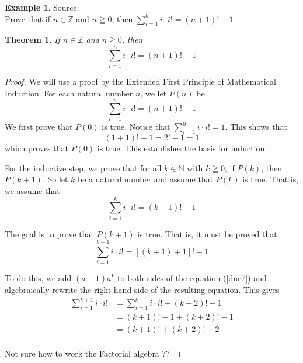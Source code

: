 \documentclass{book}
\newtheorem{theorem}{Theorem}[section]
\theoremstyle{definition}
\newtheorem{example}{Example}[definition]
\theoremstyle{remark}
\newcommand{\bb}[1]{\mathbb{#1}}
\newcommand{\m}{\cdot}
\begin{document}
\newpage
\begin{example}
Source: \cite[C.10]{Hammack} \\ 
Prove that if $n \in \bb{Z}$ and $n \geqq 0$, then $\sum_{i=1}^{k}{i \m i!} = (n+1)! - 1$

\begin{tcolorbox}
    \begin{theorem}
        If $n \in \bb{Z}$ and $n \geqq 0$, then
        \begin{equation*}
             \sum_{i=1}^{n}{i \m i!} = (n+1)! - 1                
        \end{equation*}
    \end{theorem}
\end{tcolorbox}

\begin{proof}
        We will use a proof by the Extended First Principle of Mathematical Induction. For each natural number $n$, we let $P(n)$ be
            \begin{equation*}
                \sum_{i=1}^{n}{i \m i!} = (n+1)! - 1  
            \end{equation*}
        We first prove that $P(0)$ is true. Notice that $\sum_{i=1}^{0}{i \m i!} = 1$. This shows that   
            \begin{equation*}
                 (1+1)! - 1 = 2! - 1 = 1
            \end{equation*}
        which proves that $P(0)$ is true. This establishes the basis for induction. 
        
        For the inductive step, we prove that for all $k \in \bb{N}$ with $k \geqq 0$, if $P(k)$, then $P(k+1)$. So let $k$ be a natural number and assume that $P(k)$ is true. That is, we assume that 
            \begin{equation*}
                \sum_{i=1}^{k}{i \m i!} = (k+1)! - 1               
            \end{equation*}
        
        The goal is to prove that $P(k+1)$ is true. That is, it must be proved that  
            \begin{equation}
            \label{dne7}
                \sum_{i=1}^{k+1}{i \m i!} = [(k+1)+1]! - 1          
            \end{equation}
        
        To do this, we add $(a-1)a^k$ to both sides of the equation (\ref{dne7}) and algebraically rewrite the right hand side of the resulting equation. This gives
            \begin{align*}
                \sum_{i=1}^{k+1}{i \m i!} & = \sum_{i=1}^{k}{i \m i!} + (k+2)! - 1 \\
                    & = (k+1)! - 1 + (k+2)! - 1  \\
                    & = (k+1)! + (k+2)! - 2 \\
        \end{align*}
        
Not sure how to work the Factorial algebra ??
\end{proof}

\end{example}
\end{document}
